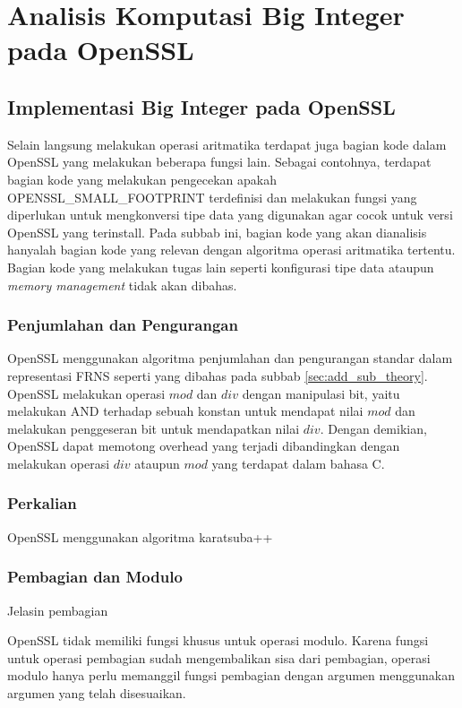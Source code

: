 \section{Analisis Komputasi Big Integer pada OpenSSL}

\subsection{Implementasi Big Integer pada OpenSSL}

Selain langsung melakukan operasi aritmatika terdapat juga bagian kode dalam OpenSSL yang melakukan beberapa fungsi lain. Sebagai contohnya, terdapat bagian kode yang melakukan pengecekan apakah OPENSSL\_SMALL\_FOOTPRINT terdefinisi dan melakukan fungsi yang diperlukan untuk mengkonversi tipe data yang digunakan agar cocok untuk versi OpenSSL yang terinstall. Pada subbab ini, bagian kode yang akan dianalisis hanyalah bagian kode yang relevan dengan algoritma operasi aritmatika tertentu. Bagian kode yang melakukan tugas lain seperti konfigurasi tipe data ataupun \textit{memory management} tidak akan dibahas.

\subsubsection{Penjumlahan dan Pengurangan}
OpenSSL menggunakan algoritma penjumlahan dan pengurangan standar dalam representasi FRNS seperti yang dibahas pada subbab \ref{sec:add_sub_theory}. OpenSSL melakukan operasi $mod$ dan $div$ dengan manipulasi bit, yaitu melakukan AND terhadap sebuah konstan untuk mendapat nilai $mod$ dan melakukan penggeseran bit untuk mendapatkan nilai $div$. Dengan demikian, OpenSSL dapat memotong overhead yang terjadi dibandingkan dengan melakukan operasi $div$ ataupun $mod$ yang terdapat dalam bahasa C.

\subsubsection{Perkalian}
OpenSSL menggunakan algoritma karatsuba++

\subsubsection{Pembagian dan Modulo}
Jelasin pembagian

OpenSSL tidak memiliki fungsi khusus untuk operasi modulo. Karena fungsi untuk operasi pembagian sudah mengembalikan sisa dari pembagian, operasi modulo hanya perlu memanggil fungsi pembagian dengan argumen menggunakan argumen yang telah disesuaikan.

